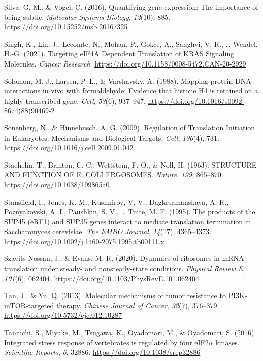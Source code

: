 \documentclass[12pt,openany]{book}
\begin{document}
\hypertarget{ref-Silva2016}{}
Silva, G. M., \& Vogel, C. (2016). Quantifying gene expression: The
importance of being subtle. \emph{Molecular Systems Biology},
\emph{12}(10), 885. \url{https://doi.org/10.15252/msb.20167325}

\hypertarget{ref-Singh2021}{}
Singh, K., Lin, J., Lecomte, N., Mohan, P., Gokce, A., Sanghvi, V. R.,
\ldots{} Wendel, H.-G. (2021). Targeting eIF4A Dependent Translation of
KRAS Signaling Molecules. \emph{Cancer Research}.
\url{https://doi.org/10.1158/0008-5472.CAN-20-2929}

\hypertarget{ref-Solomon1988}{}
Solomon, M. J., Larsen, P. L., \& Varshavsky, A. (1988). Mapping
protein-DNA interactions in vivo with formaldehyde: Evidence that
histone H4 is retained on a highly transcribed gene. \emph{Cell},
\emph{53}(6), 937--947.
\url{https://doi.org/10.1016/s0092-8674(88)90469-2}

\hypertarget{ref-Sonenberg2009}{}
Sonenberg, N., \& Hinnebusch, A. G. (2009). Regulation of Translation
Initiation in Eukaryotes: Mechanisms and Biological Targets.
\emph{Cell}, \emph{136}(4), 731.
\url{https://doi.org/10.1016/j.cell.2009.01.042}

\hypertarget{ref-Staehelin1963a}{}
Staehelin, T., Brinton, C. C., Wettstein, F. O., \& Noll, H. (1963).
STRUCTURE AND FUNCTION OF E. COLI ERGOSOMES. \emph{Nature}, \emph{199},
865--870. \url{https://doi.org/10.1038/199865a0}

\hypertarget{ref-Stansfield1995}{}
Stansfield, I., Jones, K. M., Kushnirov, V. V., Dagkesamanskaya, A. R.,
Poznyakovski, A. I., Paushkin, S. V., \ldots{} Tuite, M. F. (1995). The
products of the SUP45 (eRF1) and SUP35 genes interact to mediate
translation termination in Saccharomyces cerevisiae. \emph{The EMBO
Journal}, \emph{14}(17), 4365--4373.
\url{https://doi.org/10.1002/j.1460-2075.1995.tb00111.x}

\hypertarget{ref-Szavits-Nossan2020b}{}
Szavits-Nossan, J., \& Evans, M. R. (2020). Dynamics of ribosomes in
mRNA translation under steady- and nonsteady-state conditions.
\emph{Physical Review E}, \emph{101}(6), 062404.
\url{https://doi.org/10.1103/PhysRevE.101.062404}

\hypertarget{ref-Tan2013}{}
Tan, J., \& Yu, Q. (2013). Molecular mechanisms of tumor resistance to
PI3K-mTOR-targeted therapy. \emph{Chinese Journal of Cancer},
\emph{32}(7), 376--379. \url{https://doi.org/10.5732/cjc.012.10287}

\hypertarget{ref-Taniuchi2016}{}
Taniuchi, S., Miyake, M., Tsugawa, K., Oyadomari, M., \& Oyadomari, S.
(2016). Integrated stress response of vertebrates is regulated by four
eIF2\(\alpha\) kinases. \emph{Scientific Reports}, \emph{6}, 32886.
\url{https://doi.org/10.1038/srep32886}
\end{document}
